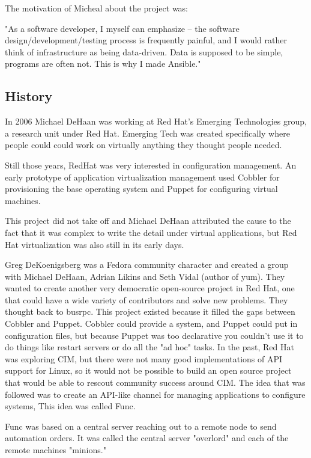 \documentclass[12pt,a4paper,openright,twoside]{book}
\begin{document}
The motivation of Micheal about the project was:


"As a software developer, I myself can emphasize -- the software design/development/testing process is frequently painful, and I would rather think of infrastructure as being data-driven. Data is supposed to be simple, programs are often not. This is why I made Ansible."

\subsection{History}
In 2006 Michael DeHaan was working at Red Hat's Emerging Technologies group, a research unit under Red Hat. Emerging Tech was created specifically where people could could work on virtually anything they thought people needed.


Still those years, RedHat was very interested in configuration management. An early prototype of application virtualization management used Cobbler for provisioning the base operating system and Puppet for configuring virtual machines.


This project did not take off and Michael DeHaan attributed the cause to the fact that it was complex to write the detail under virtual applications, but Red Hat virtualization was also still in its early days.


Greg DeKoenigsberg was a Fedora community character and created a group with Michael DeHaan, Adrian Likins and Seth Vidal (author of yum). They wanted to create another very democratic open-source project in Red Hat, one that could have a wide variety of contributors and solve new problems. They thought back to busrpc. This project existed because it filled the gaps between Cobbler and Puppet. Cobbler could provide a system, and Puppet could put in configuration files, but because Puppet was too declarative you couldn't use it to do things like restart servers or do all the "ad hoc" tasks. In the past, Red Hat was exploring CIM, but there were not many good implementations of API support for Linux, so it would not be possible to build an open source project that would be able to rescout community success around CIM. The idea that was followed was to create an API-like channel for managing applications to configure systems, This idea was called Func.


Func was based on a central server reaching out to a remote node to send automation orders. It was called the central server "overlord" and each of the remote machines "minions." 
\end{document}
